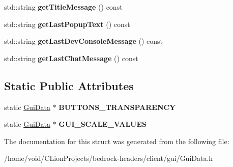 \begin{DoxyCompactItemize}
std\+::string {\bfseries get\+Title\+Message} () const
\item 
\mbox{\label{struct_gui_data_af890b645b2b8578c24629099245861a3}} 
std\+::string {\bfseries get\+Last\+Popup\+Text} () const
\item 
\mbox{\label{struct_gui_data_a90e5190ee95b5b7a4c5a3bcee83e95ec}} 
std\+::string {\bfseries get\+Last\+Dev\+Console\+Message} () const
\item 
\mbox{\label{struct_gui_data_a91a06eaf328f9d861fb446ea0bd45965}} 
std\+::string {\bfseries get\+Last\+Chat\+Message} () const
\end{DoxyCompactItemize}
\subsection*{Static Public Attributes}
\begin{DoxyCompactItemize}
\item 
\mbox{\label{struct_gui_data_a5330b515cb81bc74493bbb9edfb6cff3}} 
static \mbox{\hyperlink{struct_gui_data}{Gui\+Data}} $\ast$ {\bfseries B\+U\+T\+T\+O\+N\+S\+\_\+\+T\+R\+A\+N\+S\+P\+A\+R\+E\+N\+CY}
\item 
\mbox{\label{struct_gui_data_ada196a801a9d07c2c9359e8f763df838}} 
static \mbox{\hyperlink{struct_gui_data}{Gui\+Data}} $\ast$ {\bfseries G\+U\+I\+\_\+\+S\+C\+A\+L\+E\+\_\+\+V\+A\+L\+U\+ES}
\end{DoxyCompactItemize}


The documentation for this struct was generated from the following file\+:\begin{DoxyCompactItemize}
\item 
/home/void/\+C\+Lion\+Projects/bedrock-\/headers/client/gui/Gui\+Data.\+h\end{DoxyCompactItemize}
